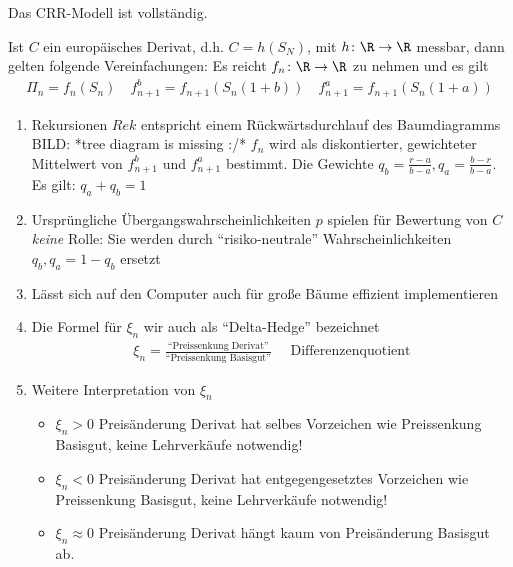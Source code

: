 \begin{conclusion}
	Das CRR-Modell ist vollständig.
\end{conclusion}
\begin{conclusion}
	Ist $C$ ein europäisches Derivat, d.h. $C = h(S_N)$, mit $h\colon \R \to \R$ messbar, dann gelten folgende Vereinfachungen: Es reicht $f_n \colon \R \to \R$ zu nehmen und es gilt
	\begin{align*}
		\Pi_n = f_n(S_n) \quad f_{n+1}^b = f_{n+1}(S_n(1+b)) \quad f^a_{n+1} = f_{n+1}(S_n(1+a))
	\end{align*}
\end{conclusion}
\begin{*remark}
	\begin{enumerate}
		\item Rekursionen $Rek$ entspricht einem Rückwärtsdurchlauf des Baumdiagramms BILD: *tree diagram is missing :/* $f_n$ wird als diskontierter, gewichteter Mittelwert von $f^b_{n+1}$ und $f^a_{n+1}$ bestimmt. Die Gewichte $q_b = \frac{r-a}{b-a},q_a = \frac{b-r}{b-a}$. Es gilt: $q_a + q_b = 1$
		\item Ursprüngliche Übergangswahrscheinlichkeiten $p$ spielen für Bewertung von $C$ \emph{keine} Rolle: Sie werden durch ``risiko-neutrale'' Wahrscheinlichkeiten $q_b, q_a = 1-q_b$ ersetzt
		\item Lässt sich auf den Computer auch für große Bäume effizient implementieren
		\item Die Formel für $\xi_n$ wir auch als ``Delta-Hedge'' bezeichnet
		\begin{align*}
			\xi_n = \frac{\text{``Preissenkung Derivat''}}{\text{``Preissenkung Basisgut''}} \quad \text{ Differenzenquotient}
		\end{align*}
		\item Weitere Interpretation von $\xi_n$
			\begin{itemize}
				\item $\xi_n > 0$ Preisänderung Derivat hat selbes Vorzeichen wie Preissenkung Basisgut, keine Lehrverkäufe notwendig!
				\item $\xi_n < 0$ Preisänderung Derivat hat entgegengesetztes Vorzeichen wie Preissenkung Basisgut, keine Lehrverkäufe notwendig!
				\item $\xi_n \approx 0$ Preisänderung Derivat hängt kaum von Preisänderung Basisgut ab.
			\end{itemize}
	\end{enumerate}
\end{*remark}

